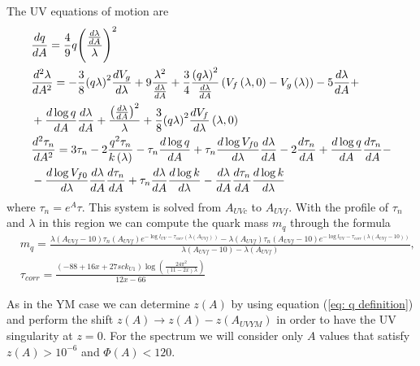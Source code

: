 \documentclass[10 pt]{article}
\begin{document}
The UV equations of motion are
\begin{align}
&\frac{dq}{dA} =  \frac{4}{9} q {\left(\frac{\frac{d\lambda}{dA}}{\lambda}\right)}^2 \\
&\frac{d^2\lambda}{dA^2} = -\frac{3}{8}  {\left(q \lambda \right)}^2 \frac{d V_g}{d\lambda} + 9 \frac{\lambda^2}{\frac{d\lambda}{dA}} + \frac{3}{4} \frac{{\left(q \lambda \right)}^2}{\frac{d\lambda}{dA}} \left( V_f\left(\lambda, 0\right) - V_g \left(\lambda\right) \right) - 5 \frac{d\lambda}{dA}  + \\
& + \frac{d \log q}{dA} \frac{d\lambda}{d A} + \frac{{\left( \frac{d\lambda}{dA}\right)}^2}{\lambda} + \frac{3}{8} {\left( q \lambda \right)}^2 \frac{d V_f}{d\lambda} \left(\lambda, 0 \right) \\ \notag
& \frac{d^2 \tau_n}{dA^2} = 3 \tau_n - 2 \frac{q^2 \tau_n}{k\left(\lambda\right)} - \tau_n \frac{d \log q}{dA} + \tau_n \frac{d \log V_{f0}}{d\lambda} \frac{d\lambda}{dA} - 2 \frac{d\tau_n}{d A} + \frac{d\log q}{d A} \frac{d \tau_n}{dA} - \\
& - \frac{d \log V_{f0}}{d\lambda} \frac{d\lambda}{dA} \frac{d\tau_n}{dA} + \tau_n \frac{d\lambda}{dA} \frac{d \log k}{d\lambda} - \frac{d\lambda}{dA} \frac{d\tau_n}{dA} \frac{d \log k}{d\lambda}
\end{align}
where $\tau_n = e^A \tau$. This system is solved from $A_{UVc}$ to $A_{UVf}$. With the profile of $\tau_n$ and $\lambda$ in this region we can compute the quark mass $m_q$ through the formula
\begin{align}
&m_q = \frac{\lambda \left(A_{UVf} - 10\right) \tau_n\left(A_{UVf}\right)e^{- \log l_{UV} - \tau_{corr}\left(\lambda\left(A_{UVf}\right)\right)} - \lambda \left(A_{UVf} \right) \tau_n\left(A_{UVf} - 10\right)e^{- \log l_{UV} - \tau_{corr}\left(\lambda\left(A_{UVf} - 10\right)\right)} }{\lambda\left(A_{UVf} - 10\right) - \lambda\left(A_{UVf}\right)}, \\
& \tau_{corr} = \frac{\left(-88 + 16 x + 27 sc k_{U1}\right) \log\left( \frac{24 \pi^2}{\left(11 - 2 x\right) \lambda}\right)}{12 x - 66}
\end{align}

As in the YM case we can determine $z\left(A\right)$ by using equation (\ref{eq: q definition}) and perform the shift $z\left(A\right) \to z\left(A\right) - z\left(A_{UVYM} \right) $ in order to have the UV singularity at $z = 0$. For the spectrum we will consider only  $A$ values that satisfy $z\left(A\right) > 10^{-6}$ and $\Phi\left(A\right) < 120$.
\end{document}
